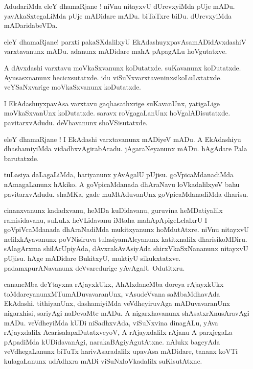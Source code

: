 \documentclass{article}
\begin{document}
\begin{mn}%
AdudariMda eleY dhamaRjane ! niVnu nitayxvU dUrevxyiMda pUje mADu. yavAkaSxtegaLiMda pUje mADidare 
mADu. biTaTxre biDu. dUrevxyiMda mADaridabeVDa.
\end{mn}

\begin{mn}%
eleY dhamaRjane! parxti pakaSXdalilxyU EkAdashuyxpavAsamADidAvxdashiV varxtavanunx mADu. adanunx 
mADidare mahA pApagALu hoVgutatxve.
\end{mn}

\begin{mn}%
A dAvxdashi varxtavu moVkaSxvanunx koDutatxde. suKavanunx koDutatxde. Ayusasxnanunx hecicxsutatxde. 
idu viSuNxvarxtaveninxsikoLuLxtatxde. veYSaNxvarige moVkaSxvanunx koDutatxde.
\end{mn}

\begin{mn}%
I EkAdashuyxpavAsa varxtavu gaqhasathxrige suKavanUnx, yatigaLige moVkaSxvanUnx koDutatxde. saravx 
roVgagaLanUnx hoVgalADisutatxde. pavitarxvAdudu. deVhavanunx shoVSisutatxde.
\end{mn}

\begin{mn}%
eleY dhamaRjane ! I EkAdashi varxtavanunx mADiyeV mADu. A EkAdashiyu dhashamiyiMda 
vidadhxvAgirabAradu. jAgaraNeyanunx mADu. hAgAdare Pala barutatxde.
\end{mn}

\begin{mn}%
tuLasiya daLagaLiMda, hariyanunx yAvAgalU pUjisu. goVpicaMdanadiMda nAmagaLanunx hAkiko. A 
goVpicaMdanada dhAraNavu loVkadalilxyeV bahu pavitarxvAdudu. shaMKa, gade muMtAduvanUnx 
goVpicaMdanadiMda dharisu.
\end{mn}

\begin{mn}%
cinanxvanunx kadadxvanu, heMDa kuDidavanu, guruvina heMDatiyalilx ramisidavanu, suLuLx heVLidavanu 
iMtaha mahApApigeLelalxrU I goVpiVcaMdanada dhAraNadiMda mukitxyanunx hoMdutAtxre. niVnu nitayxvU 
nelilxkAyavanunx poVNisiruva tulasiyamAleyanunx katitxnalilx dharisikoMDiru. sAlagArxma 
shilArUpiyAda, dAvxrakAvAsiyAda shirxVkaSxNananunx nitayxvU pUjisu. hAge mADidare BukitxyU, 
muktiyU sikukxtatxve. padamxpurANavanunx deVvaredurige yAvAgalU Odutitxru.
\end{mn}

\begin{mn}%
cananeMba deYtayxna rAjayxkUkx, AhAlxdaneMba doreya rAjayxkUkx toMdareyanunxMTumADuvavaranUnx, 
vAsudeVvana saMbaMdhavAda EkAdashi. tithiyanUnx, dashamiyiMda veVdheyiruvAga mADuvavaranUnx 
nigarxhisi, sariyAgi naDevaMte mADu. A nigarxhavanunx shAsatxrXnusAravAgi mADu. veVdheyiMda kUDi 
niSadhxvAda, viSuNxvina dinagALu, yAva rAjayxdalilx AcarisalapxDutatxveyoV, A rAjayxdalilx rAjanu 
A parxjegaLa pApadiMda kUDidavanAgi, narakaBAgiyAgutAtxne. nAlukx bageyAda veVdhegaLanunx biTuTx 
harivAsaradalilx upavAsa mADidare, tananx koVTi kulagaLanunx udAdhxra mADi viSuNxloVkadalilx 
suKisutAtxne.
\end{mn}
\end{document}
